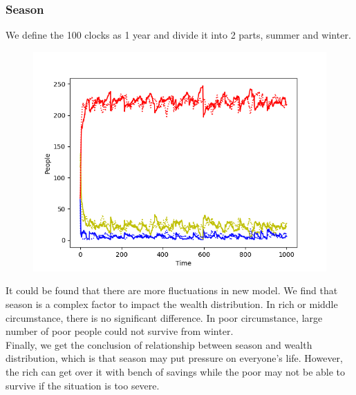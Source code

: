 \newpage
\subsubsection{Season}
We define the 100 clocks as 1 year and divide it into 2 parts, summer and winter. 
\begin{figure}[H]
	\begin{center}
		\includegraphics[scale= 0.6]{season.png}
	\end{center}
\end{figure}

It could be found that there are more fluctuations in new model. We find that season is a complex factor to impact the wealth distribution. In rich or middle circumstance, there is no significant difference. In poor circumstance, large number of poor people could not survive from winter.\\

Finally, we get the conclusion of relationship between season and wealth distribution, which is that season may put pressure on everyone's life. However, the rich can get over it with bench of savings while the poor may not be able to survive if the situation is too severe.

